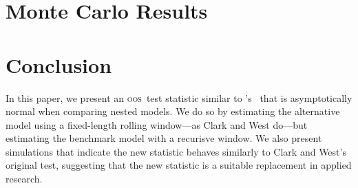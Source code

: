 \documentclass[12pt]{article}
\newcommand\poscw{\citeauthor{ClW:06}'s \citeyearpar{ClW:06,ClW:07}}
\newcommand{\oos}{\textsc{oos}}
\begin{document}
\section{Monte Carlo Results}\label{sec:2}

\section{Conclusion}\label{sec:3}
In this paper, we present an \oos\ test statistic similar to \poscw\
that is asymptotically normal when comparing nested models.  We do so
by estimating the alternative model using a fixed-length rolling
window---as Clark and West do---but estimating the benchmark model
with a recurisve window.  We also present simulations that indicate
the new statistic behaves similarly to Clark and West's original test,
suggesting that the new statistic is a suitable replacement in applied
research.  


\end{document}
